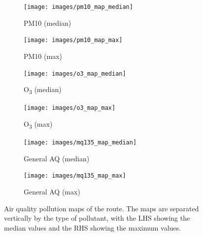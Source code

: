 \documentclass[11pt]{report}
\begin{document}
\begin{figure}[!htbp]
    \centering
    \begin{minipage}{1\linewidth}
            \begin{subfigure}[t]{.5\linewidth}
                \texttt{[image: images/pm10\_map\_median]}
                \caption{PM10 (median)}
                \label{fig:pm10_map_median}
            \end{subfigure}
            \begin{subfigure}[t]{.5\linewidth}
            	\texttt{[image: images/pm10\_map\_max]}
            	\caption{PM10 (max)}
            	\label{fig:pm10_map_max}
	   \end{subfigure}
        \end{minipage}
    \begin{minipage}{1\linewidth}
            \begin{subfigure}[t]{.5\linewidth}
                \texttt{[image: images/o3\_map\_median]}
                \caption{O\textsubscript{3} (median)}
                \label{fig:o3_map_median}
            \end{subfigure}
            \begin{subfigure}[t]{.5\linewidth}
            	\texttt{[image: images/o3\_map\_max]}
            	\caption{O\textsubscript{3} (max)}
            	\label{fig:o3_map_max}
	   \end{subfigure}
        \end{minipage}
    \begin{minipage}{1\linewidth}
            \begin{subfigure}[t]{.5\linewidth}
                \texttt{[image: images/mq135\_map\_median]}
                \caption{General AQ (median)}
                \label{fig:mq135_map_median}
            \end{subfigure}
            \begin{subfigure}[t]{.5\linewidth}
            	\texttt{[image: images/mq135\_map\_max]}
            	\caption{General AQ (max)}
            	\label{fig:mq135_map_max}
	   \end{subfigure}
        \end{minipage}
    \caption[Air quality pollution maps of the route.]{Air quality pollution maps of the route. The maps are separated vertically by the type of pollutant, with the LHS showing the median values and the RHS showing the maximum values.}
    \label{fig:route_pollution_maps}
\end{figure}
\end{document}
